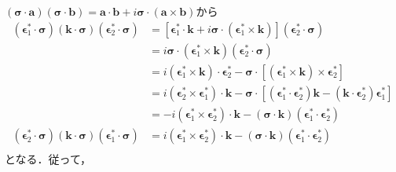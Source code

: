 $(\boldsymbol\sigma \cdot \boldsymbol{a}) (\boldsymbol\sigma \cdot \boldsymbol{b}) = \boldsymbol{a} \cdot \boldsymbol{b} + i \boldsymbol\sigma \cdot (\boldsymbol{a} \times \boldsymbol{b})$から
\begin{align*}
  (\boldsymbol{\epsilon}_1^\ast \cdot \boldsymbol\sigma)(\boldsymbol{k}\cdot\boldsymbol\sigma)(\boldsymbol{\epsilon}_2^\ast \cdot \boldsymbol\sigma)
  &= [\boldsymbol{\epsilon}_1^\ast \cdot \boldsymbol{k} + i \boldsymbol\sigma \cdot (\boldsymbol{\epsilon}_1^\ast \times \boldsymbol{k})](\boldsymbol{\epsilon}_2^\ast \cdot \boldsymbol\sigma) \\
  &= i \boldsymbol\sigma \cdot (\boldsymbol{\epsilon}_1^\ast \times \boldsymbol{k})(\boldsymbol{\epsilon}_2^\ast \cdot \boldsymbol\sigma) \\
  &= i (\boldsymbol{\epsilon}_1^\ast \times \boldsymbol{k}) \cdot \boldsymbol{\epsilon}_2^\ast - \boldsymbol\sigma \cdot [(\boldsymbol{\epsilon}_1^\ast \times \boldsymbol{k}) \times \boldsymbol{\epsilon}_2^\ast] \\
  &= i (\boldsymbol{\epsilon}_2^\ast \times \boldsymbol{\epsilon}_1^\ast) \cdot \boldsymbol{k} - \boldsymbol\sigma \cdot [(\boldsymbol{\epsilon}_1^\ast \cdot \boldsymbol{\epsilon}_2^\ast) \boldsymbol{k} - (\boldsymbol{k} \cdot \boldsymbol{\epsilon}_2^\ast) \boldsymbol{\epsilon}_1^\ast] \\
  &= - i (\boldsymbol{\epsilon}_1^\ast \times \boldsymbol{\epsilon}_2^\ast) \cdot \boldsymbol{k}
  - (\boldsymbol\sigma \cdot \boldsymbol{k})(\boldsymbol{\epsilon}_1^\ast \cdot \boldsymbol{\epsilon}_2^\ast) \\
  (\boldsymbol{\epsilon}_2^\ast \cdot \boldsymbol\sigma)(\boldsymbol{k}\cdot\boldsymbol\sigma)(\boldsymbol{\epsilon}_1^\ast \cdot \boldsymbol\sigma)
  &=  i (\boldsymbol{\epsilon}_1^\ast \times \boldsymbol{\epsilon}_2^\ast) \cdot \boldsymbol{k}
  - (\boldsymbol\sigma \cdot \boldsymbol{k})(\boldsymbol{\epsilon}_1^\ast \cdot \boldsymbol{\epsilon}_2^\ast) \\
\end{align*}
となる．従って，
